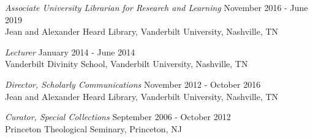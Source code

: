 \documentclass[]{res} %
\newif\ifbullets
\begin{document}
\begin{resume}
{\sl Associate University Librarian for Research and Learning} \hfill November 2016 - June 2019 \\
Jean and Alexander Heard Library, Vanderbilt University, Nashville, TN 

\ifbullets
\begin{itemize}
    \item Promoted new models of scholarly communications and digital scholarship
    \item Supported learning across campus through the library’s teaching program
    \item Supervised the three distinctive collections units in the library system: Special Collections and University Archives, Eskind Biomedical Special Collections, and the Vanderbilt University Television News Archive
\end{itemize}
\fi

{\sl Lecturer} \hfill January 2014 - June 2014 \\
Vanderbilt Divinity School, Vanderbilt University, Nashville, TN 

{\sl Director, Scholarly Communications} \hfill November 2012 - October 2016 \\
Jean and Alexander Heard Library, Vanderbilt University, Nashville, TN

\ifbullets
\begin{itemize}
    \item Appointed the first director to build new department
    \item Advanced library support for digital scholarship in the humanities, social sciences, and natural sciences
    \item Provided copyright guidance to librarians, faculty, students, and staff
    \item Supervised four direct and three indirect reports
\end{itemize}
\fi

{\sl Curator, Special Collections} \hfill September 2006 - October 2012 \\
Princeton Theological Seminary, Princeton, NJ 

\ifbullets
\begin{itemize}
    \item Supervised six staff members
    \item Edited the \emph{Luce Library Bulletin}
    \item Served as the product owner for the digital collections team
    \item Launched the \emph{Theological Commons}, largest open-access library of religious and theological literature
\end{itemize}
\fi 


\end{resume}
\end{document}
